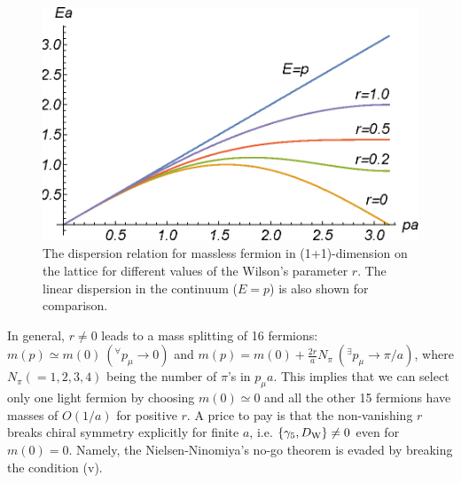 \begin{figure}[t]
\begin{center}
\includegraphics[scale=0.75]{Chapter3-figures/dispersion.eps}
 \end{center}
\caption{The  dispersion relation for massless fermion in (1+1)-dimension on the lattice for different values of 
 the Wilson's parameter $r$.  The linear dispersion in the continuum ($E=p$) is also shown for comparison.}
\label{fig:dispersion}
\end{figure}
 
 In general, $r\neq 0$  leads to a mass splitting   of 16 fermions:
$    m(p)  \simeq  m(0)\  (^{\forall }p_{\mu} \rightarrow 0) $ and 
$m(p)= m(0) +  \frac{2r}{a}N_{\pi}  \   (^{\exists }p_{\mu} \rightarrow \pi/a) $,
 where $N_{\pi}(=1,2,3,4)$ being the number of $\pi$'s
 in  $p_{\mu}a$.  This implies that we can select only one light
 fermion by choosing $m(0) \simeq 0$ and all the other
 15 fermions have masses of $O(1/a) $  for positive  $r$.  
 A price to pay  is that the non-vanishing  $r$ breaks chiral symmetry
 explicitly for finite $a$, i.e. $\{ \gamma_5, D_{\rm W} \} \neq 0$ even for $m(0)=0$.   
  Namely, the Nielsen-Ninomiya's no-go theorem is evaded by breaking the condition (v).


